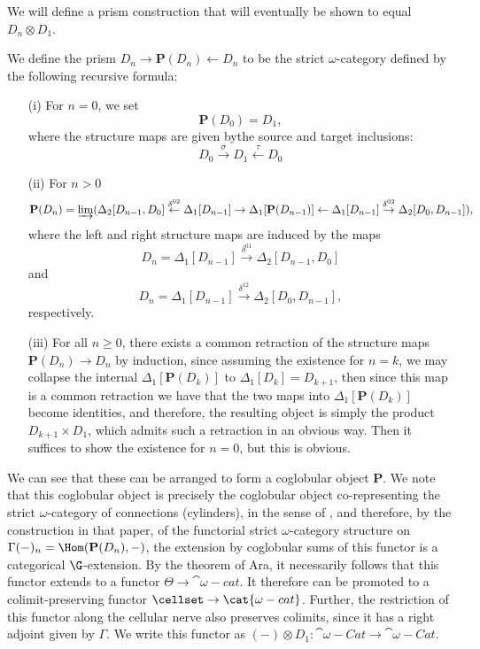 We will define a prism construction that will eventually be shown to equal \(D_n\otimes D_1\).  

\begin{defn}We define the prism \(D_n \to \mathbf{P}(D_n) \leftarrow D_n\) to be the strict \(\omega\)-category defined by the following recursive formula:
\begin{enumerate}
\item [(i)] For \(n=0\), we set \[\mathbf{P}(D_0)=D_1,\] where the structure maps are given bythe source and target inclusions: \[D_0\overset{\sigma}{\to} D_1 \overset{\tau}{\leftarrow} D_0\]
\item [(ii)] For \(n>0\) \[\mathbf{P}(D_n)=\varinjlim(\Delta_2[D_{n-1},D_0] \overset{\delta^{02}}{\leftarrow} \Delta_1[D_{n-1}] \to \Delta_1[\mathbf{P}(D_{n-1})] \leftarrow \Delta_1[D_{n-1}] \overset{\delta^{02}}{\to}  \Delta_2[D_0,D_{n-1}]),\]
where the left and right structure maps are induced by the maps \[D_n=\Delta_1[D_{n-1}]\overset{\delta^{01}}{\to}\Delta_2[D_{n-1},D_0]\] and \[D_n=\Delta_1[D_{n-1}]\overset{\delta^{12}}{\to}\Delta_2[D_0,D_{n-1}],\] respectively.  
\item[(iii)] For all \(n\geq 0\), there exists a common retraction of the structure maps \(\mathbf{P}(D_n) \to D_n\) by induction, since assuming the existence for \(n=k\), we may collapse the internal \(\Delta_1[\mathbf{P}(D_{k})]\) to \(\Delta_1[D_{k}]=D_{k+1}\), then since this map is a common retraction we have that the two maps into \(\Delta_1[\mathbf{P}(D_{k})]\) become identities, and therefore, the resulting object is simply the product \(D_{k+1}\times D_1\), which admits such a retraction in an obvious way.  Then it suffices to show the existence for \(n=0\), but this is obvious.  
\end{enumerate}
\end{defn}

We can see that these can be arranged to form a coglobular object \(\mathbf{P}\). We note that this coglobular object is precisely the coglobular object co-representing the strict \(\omega\)-category of connections (cylinders), in the sense of \cite{metayer-resolution}, and therefore, by the construction in that paper, of the functorial strict \(\omega\)-category structure on \(\Gamma(-)_n=\Hom(\mathbf{P}(D_n),-)\), the extension by coglobular sums of this functor is a categorical \(\G\)-extension.  By the theorem of Ara, it necessarily follows that this functor extends to a functor \(\Theta\to \cat{\omega-cat}\).  It therefore can be promoted to a colimit-preserving functor \(\cellset \to \cat{\omega-cat}\).  Further, the restriction of this functor along the cellular nerve also preserves colimits, since it has a right adjoint given by \(\Gamma\).  We write this functor as \((-)\otimes D_1:\cat{\omega-Cat}\to \cat{\omega-Cat}\).  


